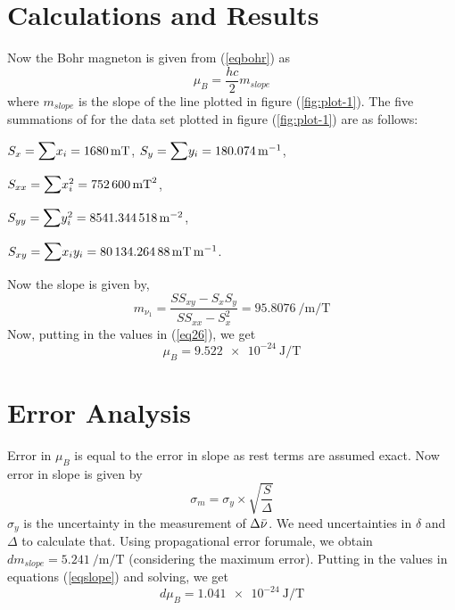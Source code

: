 \documentclass[%
 reprint,
nofootinbib,
 amsmath,amssymb,
 aps,
floatfix,
]{revtex4-2}
\begin{document}
\section{Calculations and Results}
    Now the Bohr magneton is given from (\ref{eqbohr}) as
    \begin{equation}
    \label{eq26}
        \mu_B = \dfrac{hc}{2} m_{slope}
    \end{equation}
    where $m_{slope}$ is the slope of the line plotted in figure (\ref{fig:plot-1}).
    The five summations of for the data set plotted in figure (\ref{fig:plot-1}) are as follows:
    \par
    \vspace{0.5cm}
    $S_{x} = \mathlarger{\mathlarger{\sum}} x_{i} = \SI{1680}{\milli \tesla}$, \hspace{0.25cm} $S_{y} = \mathlarger{\mathlarger{\sum}} y_{i} = \SI{180.074}{\per \metre}$,
    \par
    \vspace{0.5cm}
    $S_{xx} = \mathlarger{\mathlarger{\sum}} x_{i}^2 = \SI{752600}{\milli \tesla \squared}$,
    \par
    \vspace{0.5cm}
    $S_{yy} = \mathlarger{\mathlarger{\sum}} y_{i}^2 = \SI{8541.344518}{\per \metre \squared}$,
    \par
    \vspace{0.5cm}
    $S_{xy} = \mathlarger{\mathlarger{\sum}} x_{i}y_{i} = \SI{80134.26488}{\milli \tesla \per \metre}$.
    \par
    \vspace{0.5cm}
    Now the slope is given by,
    \begin{equation}
        m_{\nu_1} = \dfrac{S S_{xy} - S_{x}S_{y}}{S S_{xx} - S_{x}^2} = \SI{95.8076}{\per \metre \per \tesla}
    \end{equation}
    Now, putting in the values in (\ref{eq26}), we get 
        \begin{equation}
            \boxed{\mu_B = \SI{9.522e-24}{\joule \per \tesla}} 
        \end{equation}
    
    

\section{Error Analysis}
    Error in $\mu_B$ is equal to the error in slope as rest terms are assumed exact. Now error in slope is given by
    \begin{equation}
    \label{eqslope}
        \sigma_m = \sigma_y \times \sqrt{\dfrac{S}{\Delta}}
    \end{equation}
    $\sigma_y$ is the uncertainty in the measurement of $\Delta \Bar{\nu}$. We need uncertainties in $\delta$ and $\Delta$ to calculate that. Using propagational error forumale, we obtain $d m_{slope} = \SI{5.241}{\per \metre \per \tesla}$ (considering the maximum error). Putting in the values in equations (\ref{eqslope}) and solving, we get
    \begin{equation}
        \boxed{d \mu_{B} = \SI{1.041e-24}{\joule \per \tesla}}
    \end{equation}
\end{document}

